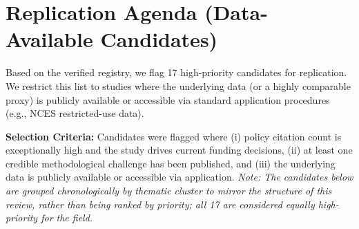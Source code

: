 \documentclass[12pt,letterpaper]{article}
\begin{document}
\section{Replication Agenda (Data-Available Candidates)}

Based on the verified registry, we flag 17 high-priority candidates for replication. We restrict this list to studies where the underlying data (or a highly comparable proxy) is publicly available or accessible via standard application procedures (e.g., NCES restricted-use data).

\noindent \textbf{Selection Criteria:} Candidates were flagged where (i) policy citation count is exceptionally high and the study drives current funding decisions, (ii) at least one credible methodological challenge has been published, and (iii) the underlying data is publicly available or accessible via application. \textit{Note: The candidates below are grouped chronologically by thematic cluster to mirror the structure of this review, rather than being ranked by priority; all 17 are considered equally high-priority for the field.}
\end{document}
